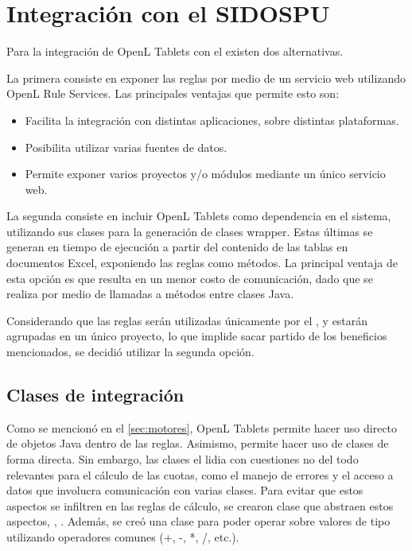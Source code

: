 \section{Integración con el SIDOSPU}

Para la integración de OpenL Tablets con el {\SIDOSPU} existen dos alternativas.

La primera consiste en exponer las reglas por medio de un servicio web utilizando OpenL Rule Services. Las principales ventajas que permite esto son:
\begin{itemize}
    \item Facilita la integración con distintas aplicaciones, sobre distintas plataformas.
    \item Posibilita utilizar varias fuentes de datos.
    \item Permite exponer varios proyectos y/o módulos mediante un único servicio web.
\end{itemize}

La segunda consiste en incluir OpenL Tablets como dependencia en el sistema, utilizando sus clases para la generación de clases wrapper. Estas últimas se generan en tiempo de ejecución a partir del contenido de las tablas en documentos Excel, exponiendo las reglas como métodos.
La principal ventaja de esta opción es que resulta en un menor costo de comunicación, dado que se realiza por medio de llamadas a métodos entre clases Java.

Considerando que las reglas serán utilizadas únicamente por el {\SIOSU}, y estarán agrupadas en un único proyecto, lo que implide sacar partido de los beneficios mencionados, se decidió utilizar la segunda opción. 

\subsection{Clases de integración}\label{ssec:integracion:clases}

Como se mencionó en el \cref{sec:motores}, OpenL Tablets permite hacer uso directo de objetos Java dentro de las reglas. Asimismo, permite hacer uso de clases de forma directa.
Sin embargo, las clases el {\SIDOSPU} lidia con cuestiones no del todo relevantes para el cálculo de las cuotas, como el manejo de errores y el acceso a datos que involucra comunicación con varias clases. Para evitar que estos aspectos se infiltren en las reglas de cálculo, se crearon clase que abstraen estos aspectos, , . Además, se creó una clase  para poder operar sobre valores de tipo  utilizando operadores comunes (+, -, *, /, etc.).


